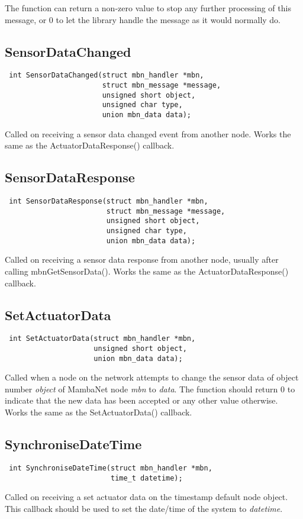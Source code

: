 The function can return a non-zero value to stop any further processing of this message, or 0 to let the library handle the message as it would normally do.


\subsection{SensorDataChanged}
\begin{verbatim}
 int SensorDataChanged(struct mbn_handler *mbn,
                       struct mbn_message *message,
                       unsigned short object,
                       unsigned char type,
                       union mbn_data data);
\end{verbatim}
Called on receiving a sensor data changed event from another node. Works the same as the ActuatorDataResponse() callback.


\subsection{SensorDataResponse}
\begin{verbatim}
 int SensorDataResponse(struct mbn_handler *mbn,
                        struct mbn_message *message,
                        unsigned short object,
                        unsigned char type,
                        union mbn_data data);
\end{verbatim}
Called on receiving a sensor data response from another node, usually after calling mbnGetSensorData(). Works the same as the ActuatorDataResponse() callback.


\subsection{SetActuatorData}
\begin{verbatim}
 int SetActuatorData(struct mbn_handler *mbn,
                     unsigned short object,
                     union mbn_data data);
\end{verbatim}
Called when a node on the network attempts to change the sensor data of object number \textit{object} of MambaNet node \textit{mbn} to \textit{data}. The function should return 0 to indicate that the new data has been accepted or any other value otherwise. Works the same as the SetActuatorData() callback.


\subsection{SynchroniseDateTime}
\begin{verbatim}
 int SynchroniseDateTime(struct mbn_handler *mbn,
                         time_t datetime);
\end{verbatim}
Called on receiving a set actuator data on the timestamp default node object. This callback should be used to set the date/time of the system to \textit{datetime}.


